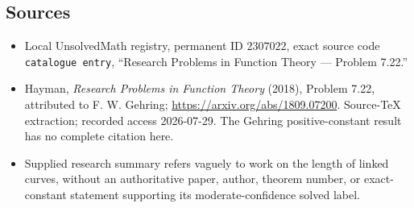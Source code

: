 \documentclass[11pt]{article}
\begin{document}
\subsection{Sources}
\begin{itemize}
\item Local UnsolvedMath registry, permanent ID \(2307022\), exact source code \texttt{catalogue entry}, ``Research Problems in Function Theory --- Problem 7.22.''
\item Hayman, \emph{Research Problems in Function Theory} (2018), Problem 7.22, attributed to F. W. Gehring; \url{https://arxiv.org/abs/1809.07200}. Source-TeX extraction; recorded access 2026-07-29. The Gehring positive-constant result has no complete citation here.
\item Supplied research summary refers vaguely to work on the length of linked curves, without an authoritative paper, author, theorem number, or exact-constant statement supporting its moderate-confidence solved label.
\end{itemize}
\end{document}
